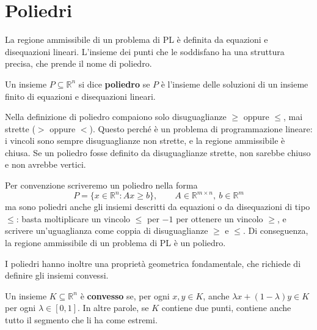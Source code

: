 \section{Poliedri}
La regione ammissibile di un problema di PL è definita da equazioni e disequazioni lineari. L'insieme dei punti che le soddisfano ha una struttura precisa, che prende il nome di poliedro.

\begin{definizione}[Poliedro]\label{def:poliedro}
Un insieme $P \subseteq \mathbb{R}^n$ si dice \textbf{poliedro} se $P$ è l'insieme delle soluzioni di un insieme finito di equazioni e disequazioni lineari.
\end{definizione}

\begin{osservazione}
Nella definizione di poliedro compaiono solo disuguaglianze $\ge$ oppure $\le$, mai strette ($>$ oppure $<$). Questo perché è un problema di programmazione lineare: i vincoli sono sempre disuguaglianze non strette, e la regione ammissibile è chiusa. Se un poliedro fosse definito da disuguaglianze strette, non sarebbe chiuso e non avrebbe vertici.
\end{osservazione}

Per convenzione scriveremo un poliedro nella forma
\[
P = \{x \in \mathbb{R}^n : A x \ge b\}, \qquad A \in \mathbb{R}^{m \times n},\ b \in \mathbb{R}^m
\]
ma sono poliedri anche gli insiemi descritti da equazioni o da disequazioni di tipo $\le$: basta moltiplicare un vincolo $\le$ per $-1$ per ottenere un vincolo $\ge$, e scrivere un'uguaglianza come coppia di disuguaglianze $\ge$ e $\le$. Di conseguenza, la regione ammissibile di un problema di PL è un poliedro.

I poliedri hanno inoltre una proprietà geometrica fondamentale, che richiede di definire gli insiemi convessi.

\begin{definizione}\label{def:convesso}
Un insieme $K \subseteq \mathbb{R}^n$ è \textbf{convesso} se, per ogni $x, y \in K$, anche $\lambda x + (1 - \lambda) y \in K$ per ogni $\lambda \in [0, 1]$. In altre parole, se $K$ contiene due punti, contiene anche tutto il segmento che li ha come estremi.
\end{definizione}


